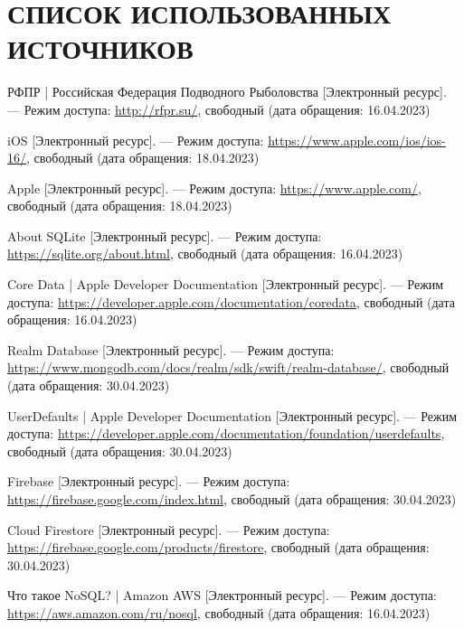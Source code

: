 \section*{СПИСОК ИСПОЛЬЗОВАННЫХ ИСТОЧНИКОВ}

\begingroup
\renewcommand{\section}[2]{}
\begin{thebibliography}{}
	
	РФПР | Российская Федерация Подводного Рыболовства [Электронный ресурс]. --- Режим доступа: \url{http://rfpr.su/}, свободный (дата обращения: 16.04.2023)
	
	iOS [Электронный ресурс]. --- Режим доступа: \url{https://www.apple.com/ios/ios-16/}, свободный (дата обращения: 18.04.2023)
	
	Apple [Электронный ресурс]. --- Режим доступа: \url{https://www.apple.com/}, свободный (дата обращения: 18.04.2023)
	
	About SQLite  [Электронный ресурс]. --- Режим доступа: \url{https://sqlite.org/about.html}, свободный (дата обращения: 16.04.2023)
	
	Core Data | Apple Developer Documentation [Электронный ресурс]. --- Режим доступа: \url{https://developer.apple.com/documentation/coredata}, свободный (дата обращения: 16.04.2023)

	Realm Database [Электронный ресурс]. --- Режим доступа: \url{https://www.mongodb.com/docs/realm/sdk/swift/realm-database/}, свободный (дата обращения: 30.04.2023)
	
	UserDefaults | Apple Developer Documentation [Электронный ресурс]. --- Режим доступа: \url{https://developer.apple.com/documentation/foundation/userdefaults}, свободный (дата обращения: 30.04.2023)
	
	 Firebase [Электронный ресурс]. --- Режим доступа: \url{https://firebase.google.com/index.html}, свободный (дата обращения: 30.04.2023)
	 
	 Cloud Firestore [Электронный ресурс]. --- Режим доступа: \url{https://firebase.google.com/products/firestore}, свободный (дата обращения: 30.04.2023)
	
	Что такое NoSQL? | Amazon AWS  [Электронный ресурс]. --- Режим доступа: \url{https://aws.amazon.com/ru/nosql}, свободный (дата обращения: 16.04.2023)
	 

\end{thebibliography}
